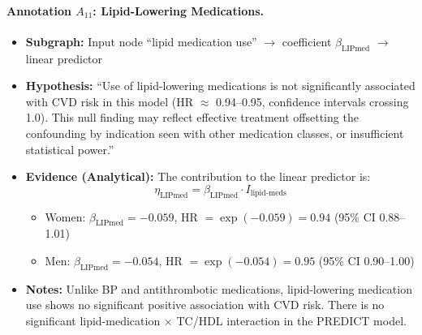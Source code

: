 \documentclass{article}
\begin{document}
\paragraph{Annotation $A_{11}$: Lipid-Lowering Medications.}
\begin{itemize}
    \item \textbf{Subgraph:} Input node ``lipid medication use'' $\rightarrow$ coefficient $\beta_{\text{LIPmed}}$ $\rightarrow$ linear predictor
    \item \textbf{Hypothesis:} ``Use of lipid-lowering medications is not significantly associated with CVD risk in this model (HR $\approx$ 0.94--0.95, confidence intervals crossing 1.0). This null finding may reflect effective treatment offsetting the confounding by indication seen with other medication classes, or insufficient statistical power.''
    \item \textbf{Evidence (Analytical):} The contribution to the linear predictor is:
    \[
    \eta_{\text{LIPmed}} = \beta_{\text{LIPmed}} \cdot I_{\text{lipid-meds}}
    \]
    \begin{itemize}
        \item Women: $\beta_{\text{LIPmed}} = -0.059$, HR $= \exp(-0.059) = 0.94$ (95\% CI 0.88--1.01)
        \item Men: $\beta_{\text{LIPmed}} = -0.054$, HR $= \exp(-0.054) = 0.95$ (95\% CI 0.90--1.00)
    \end{itemize}
    \item \textbf{Notes:} Unlike BP and antithrombotic medications, lipid-lowering medication use shows no significant positive association with CVD risk. There is no significant lipid-medication $\times$ TC/HDL interaction in the PREDICT model.
\end{itemize}
\end{document}
